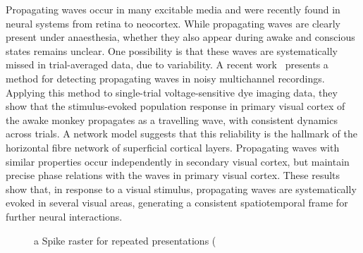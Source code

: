 \documentclass[brainsci, %
               review,submit,pdftex,moreauthors%
               ]{Definitions/mdpi}
\begin{document}
Propagating waves occur in many excitable media and were recently found in neural systems from retina to neocortex. While propagating waves are clearly present under anaesthesia, whether they also appear during awake and conscious states remains unclear. One possibility is that these waves are systematically missed in trial-averaged data, due to variability. A recent work~\citep{muller_stimulus-evoked_2014} presents a method for detecting propagating waves in noisy multichannel recordings. Applying this method to single-trial voltage-sensitive dye imaging data, they show that the stimulus-evoked population response in primary visual cortex of the awake monkey propagates as a travelling wave, with consistent dynamics across trials. A network model suggests that this reliability is the hallmark of the horizontal fibre network of superficial cortical layers. Propagating waves with similar properties occur independently in secondary visual cortex, but maintain precise phase relations with the waves in primary visual cortex. These results show that, in response to a visual stimulus, propagating waves are systematically evoked in several visual areas, generating a consistent spatiotemporal frame for further neural interactions.

\begin{figure}
\centering
\caption{a Spike raster for repeated presentations (%
}\label{fig:davis}
\end{figure}
\end{document}
